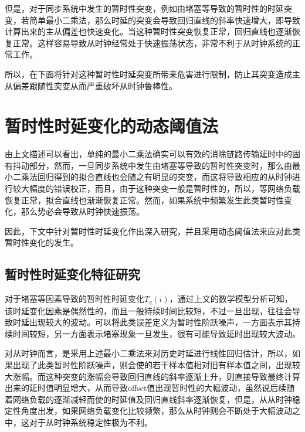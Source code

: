 但是，对于同步系统中发生的暂时性突变，例如由堵塞等导致的暂时性的时延突变，若简单最小二乘法，那么时延的突变会导致回归直线的斜率快速增大，即导致计算出来的主从偏差也快速变化。当这种暂时性突变恢复正常，回归直线也逐渐恢复正常。这样容易导致从时钟经常处于快速振荡状态，非常不利于从时钟系统的正常工作。

所以，在下面将针对这种暂时性时延突变所带来危害进行限制，防止其突变造成主从偏差跟随性突变从而严重破坏从时钟鲁棒性。

\section{暂时性时延变化的动态阈值法}
由上文描述可以看出，单纯的最小二乘法确实可以有效的消除链路传输延时中的固有抖动部分，然而，一旦同步系统中发生由堵塞等导致的暂时性突变时，那么由最小二乘法回归得到的拟合直线也会随之有明显的突变，而这将导致相应的从时钟进行较大幅度的错误校正，而且，由于这种突变一般是暂时性的，所以，等网络负载恢复正常，拟合直线也渐渐恢复正常。然而，如果系统中频繁发生此类暂时性变化，那么势必会导致从时钟快速振荡。

因此，下文中针对暂时性时延变化作出深入研究，并且采用动态阈值法来应对此类暂时性变化的发生。


\subsection{暂时性时延变化特征研究}
对于堵塞等因素导致的暂时性时延变化$T_{q}(i)$，通过上文的数学模型分析可知，该时延变化因素是偶然性的，而且一般持续时间比较短，不过一旦出现，往往会导致时延出现较大的波动。可以将此类误差定义为暂时性阶跃噪声，一方面表示其持续时间较短，另一方面表示堵塞现象一旦发生，很有可能导致延时出现较大波动。

对从时钟而言，是采用上述最小二乘法来对历史时延进行线性回归估计，所以，如果出现了此类暂时性阶跃噪声，则会使的若干样本值相对旧有样本值之间，出现较大涨幅。而这种突变的涨幅会导致回归直线的斜率逐渐上升，则直接导致最终计算出来的延时值明显增大，从而导致offset值出现暂时性的大幅波动，虽然说后续随着网络负载的逐渐减轻而使的时延值及回归直线斜率逐渐恢复，但是，从从时钟稳定性角度出发，如果网络负载变化比较频繁，那么从时钟则会不断处于大幅波动之中，这对于从时钟系统稳定性极为不利。

